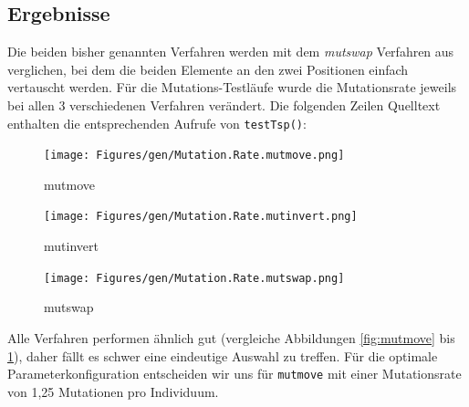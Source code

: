 \subsection{Ergebnisse}

Die beiden bisher genannten Verfahren werden mit dem \emph{mutswap}
Verfahren aus \citep{erben} verglichen, bei dem die beiden Elemente an den zwei
Positionen einfach vertauscht werden.
Für die Mutations-Testläufe wurde die Mutationsrate jeweils bei allen 3 verschiedenen
Verfahren verändert.
Die folgenden Zeilen Quelltext enthalten die entsprechenden Aufrufe von
{\tt testTsp()}:









\begin{figure}[!h]
  \texttt{[image: Figures/gen/Mutation.Rate.mutmove.png]}
  \caption{mutmove}\label{fig:mutmove}
\endminipage\hfill
{}
  \texttt{[image: Figures/gen/Mutation.Rate.mutinvert.png]}
  \caption{mutinvert}\label{fig:mutinvert}
\endminipage\hfill
{}%
  \texttt{[image: Figures/gen/Mutation.Rate.mutswap.png]}
  \caption{mutswap}\label{fig:mutswap}
\endminipage
\end{figure}

Alle Verfahren performen ähnlich gut (vergleiche Abbildungen
\ref{fig:mutmove} bis \ref{fig:mutswap}), daher fällt es schwer eine eindeutige
Auswahl zu treffen.
Für die optimale Parameterkonfiguration entscheiden wir uns für
{\tt mutmove} mit einer Mutationsrate von 1,25 Mutationen pro Individuum.

